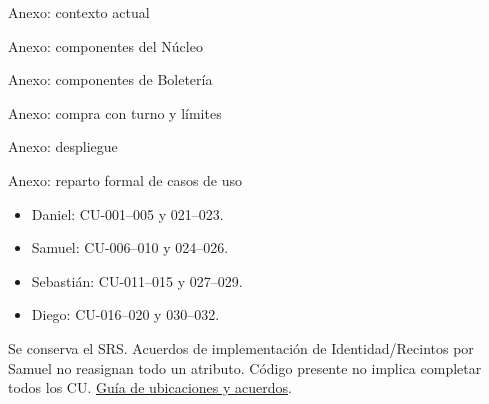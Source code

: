 \documentclass[aspectratio=169,10pt,xcolor={table}]{beamer}
\newcommand{\docrepo}[2]{\href{https://github.com/Emperador24/HEXACORE/blob/main/#1}{#2}}
\begin{document}
\appendix
\begin{frame}{Anexo: contexto actual}\centering\HexContexto\end{frame}
\begin{frame}{Anexo: componentes del Núcleo}\centering\HexComponentesNucleo\end{frame}
\begin{frame}{Anexo: componentes de Boletería}\centering\HexComponentesBoleteria\end{frame}
\begin{frame}{Anexo: compra con turno y límites}\centering\HexSecuencia\end{frame}
\begin{frame}{Anexo: despliegue}\centering\HexDespliegue\end{frame}
\begin{frame}{Anexo: reparto formal de casos de uso}
\begin{itemize}
\item Daniel: CU-001--005 y 021--023.
\item Samuel: CU-006--010 y 024--026.
\item Sebastián: CU-011--015 y 027--029.
\item Diego: CU-016--020 y 030--032.
\end{itemize}
Se conserva el SRS. Acuerdos de implementación de Identidad/Recintos por Samuel
no reasignan todo un atributo. Código presente no implica completar todos los CU.
\docrepo{Documentation/Work/GUIA-EQUIPO-MIGRACION.md}{Guía de ubicaciones y acuerdos}.
\end{frame}
\end{document}
